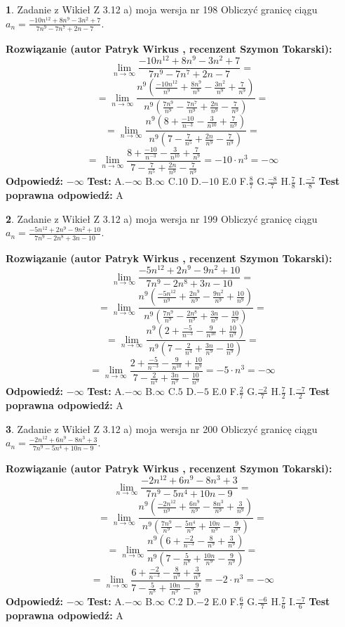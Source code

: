 \documentclass[12pt, a4paper]{article}
\theoremstyle{definition} %
\newtheorem{zad}{}
\newcommand{\zadStart}[1]{\begin{zad}#1\newline}
\newcommand{\zadStop}{\end{zad}}
\newcommand{\rozwStart}[2]{\noindent \textbf{Rozwiązanie (autor #1 , recenzent #2): }\newline}
\newcommand{\rozwStop}{\newline}
\newcommand{\odpStart}{\noindent \textbf{Odpowiedź:}\newline}
\newcommand{\odpStop}{\newline}
\newcommand{\testStart}{\noindent \textbf{Test:}\newline}
\newcommand{\testStop}{\newline}
\newcommand{\kluczStart}{\noindent \textbf{Test poprawna odpowiedź:}\newline}
\newcommand{\kluczStop}{\newline}
\begin{document}
\zadStart{Zadanie z Wikieł Z 3.12 a) moja wersja nr 198}
Obliczyć granicę ciągu $a_{n}=\frac{-10n^{12}+8n^{9}-3n^{2}+7}{7n^{9}-7n^{7}+2n-7}$.
\zadStop
\rozwStart{Patryk Wirkus}{Szymon Tokarski}
$$\lim\limits_{n\to\infty}\frac{-10n^{12}+8n^{9}-3n^{2}+7}{7n^{9}-7n^{7}+2n-7}=$$
$$=\lim\limits_{n\to\infty}\frac{n^{9}\left(\frac{-10n^{12}}{n^{9}}+\frac{8n^{9}}{n^{9}}-\frac{3n^{2}}{n^{9}}+\frac{7}{n^{9}}\right)}{n^{9}\left(\frac{7n^{9}}{n^{9}}-\frac{7n^{7}}{n^{9}}+\frac{2n}{n^{9}}-\frac{7}{n^{9}}\right)}=$$
$$=\lim\limits_{n\to\infty}\frac{n^{9}\left(8+\frac{-10}{n^{-3}}-\frac{3}{n^{10}}+\frac{7}{n^{9}}\right)}
{n^{9}\left(7-\frac{7}{n^{5}}+\frac{2n}{n^{9}}-\frac{7}{n^{9}}\right)}=$$
$$=\lim\limits_{n\to\infty}\frac{8+\frac{-10}{n^{-3}}-\frac{3}{n^{10}}+\frac{7}{n^{9}}}{7-\frac{7}{n^{5}}+\frac{2n}{n^{9}}-\frac{7}{n^{9}}}=-10\cdot n^{3} = -\infty$$
\rozwStop
\odpStart
$-\infty$
\odpStop
\testStart
A.$-\infty$
B.$\infty$
C.$10$
D.$-10$
E.$0$
F.$\frac{8}{7}$
G.$\frac{-8}{7}$
H.$\frac{7}{8}$
I.$\frac{-7}{8}$
\testStop
\kluczStart
A
\kluczStop



\zadStart{Zadanie z Wikieł Z 3.12 a) moja wersja nr 199}
Obliczyć granicę ciągu $a_{n}=\frac{-5n^{12}+2n^{9}-9n^{2}+10}{7n^{9}-2n^{8}+3n-10}$.
\zadStop
\rozwStart{Patryk Wirkus}{Szymon Tokarski}
$$\lim\limits_{n\to\infty}\frac{-5n^{12}+2n^{9}-9n^{2}+10}{7n^{9}-2n^{8}+3n-10}=$$
$$=\lim\limits_{n\to\infty}\frac{n^{9}\left(\frac{-5n^{12}}{n^{9}}+\frac{2n^{9}}{n^{9}}-\frac{9n^{2}}{n^{9}}+\frac{10}{n^{9}}\right)}{n^{9}\left(\frac{7n^{9}}{n^{9}}-\frac{2n^{8}}{n^{9}}+\frac{3n}{n^{9}}-\frac{10}{n^{9}}\right)}=$$
$$=\lim\limits_{n\to\infty}\frac{n^{9}\left(2+\frac{-5}{n^{-3}}-\frac{9}{n^{10}}+\frac{10}{n^{9}}\right)}
{n^{9}\left(7-\frac{2}{n^{4}}+\frac{3n}{n^{9}}-\frac{10}{n^{9}}\right)}=$$
$$=\lim\limits_{n\to\infty}\frac{2+\frac{-5}{n^{-3}}-\frac{9}{n^{10}}+\frac{10}{n^{9}}}{7-\frac{2}{n^{4}}+\frac{3n}{n^{9}}-\frac{10}{n^{9}}}=-5\cdot n^{3} = -\infty$$
\rozwStop
\odpStart
$-\infty$
\odpStop
\testStart
A.$-\infty$
B.$\infty$
C.$5$
D.$-5$
E.$0$
F.$\frac{2}{7}$
G.$\frac{-2}{7}$
H.$\frac{7}{2}$
I.$\frac{-7}{2}$
\testStop
\kluczStart
A
\kluczStop



\zadStart{Zadanie z Wikieł Z 3.12 a) moja wersja nr 200}
Obliczyć granicę ciągu $a_{n}=\frac{-2n^{12}+6n^{9}-8n^{3}+3}{7n^{9}-5n^{4}+10n-9}$.
\zadStop
\rozwStart{Patryk Wirkus}{Szymon Tokarski}
$$\lim\limits_{n\to\infty}\frac{-2n^{12}+6n^{9}-8n^{3}+3}{7n^{9}-5n^{4}+10n-9}=$$
$$=\lim\limits_{n\to\infty}\frac{n^{9}\left(\frac{-2n^{12}}{n^{9}}+\frac{6n^{9}}{n^{9}}-\frac{8n^{3}}{n^{9}}+\frac{3}{n^{9}}\right)}{n^{9}\left(\frac{7n^{9}}{n^{9}}-\frac{5n^{4}}{n^{9}}+\frac{10n}{n^{9}}-\frac{9}{n^{9}}\right)}=$$
$$=\lim\limits_{n\to\infty}\frac{n^{9}\left(6+\frac{-2}{n^{-3}}-\frac{8}{n^{9}}+\frac{3}{n^{9}}\right)}
{n^{9}\left(7-\frac{5}{n^{8}}+\frac{10n}{n^{9}}-\frac{9}{n^{9}}\right)}=$$
$$=\lim\limits_{n\to\infty}\frac{6+\frac{-2}{n^{-3}}-\frac{8}{n^{9}}+\frac{3}{n^{9}}}{7-\frac{5}{n^{8}}+\frac{10n}{n^{9}}-\frac{9}{n^{9}}}=-2\cdot n^{3} = -\infty$$
\rozwStop
\odpStart
$-\infty$
\odpStop
\testStart
A.$-\infty$
B.$\infty$
C.$2$
D.$-2$
E.$0$
F.$\frac{6}{7}$
G.$\frac{-6}{7}$
H.$\frac{7}{6}$
I.$\frac{-7}{6}$
\testStop
\kluczStart
A
\kluczStop
\end{document}
